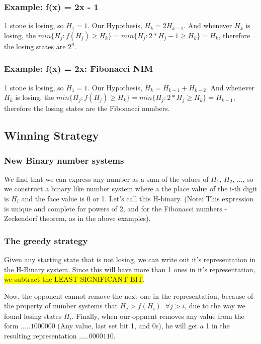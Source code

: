 \subsubsection{Example: f(x) = 2x - 1}
1 stone is losing, so $H_1 = 1$. Our Hypothesis, $H_k = 2 H_{k-1}$. And whenever $H_k$ is losing, the $min\{H_j : f(H_j) \geq H_k\} = min\{H_j : 2*H_j-1 \geq H_k\} = H_k$, therefore the losing states are $2^n$.
\subsubsection{Example: f(x) = 2x: Fibonacci NIM}
1 stone is losing, so $H_1 = 1$. Our Hypothesis, $H_k = H_{k-1} + H_{k-2}$. And whenever $H_k$ is losing, the $min\{H_j : f(H_j) \geq H_k\} = min\{H_j : 2*H_j \geq H_k\} = H_{k-1}$, therefore the losing states are the Fibonacci numbers.


\subsection{Winning Strategy}

\subsubsection{New Binary number systems}
We find that we can express any number as a sum of the values of $H_1$, $H_2$, ..., so we construct a binary like number system where a the place value of the i-th digit is $H_i$ and the face value is 0 or 1. Let's call this H-binary. (Note: This expression is unique and complete for powers of 2, and for the Fibonacci numbers - Zeckendorf theorem, as in the above examples).

\subsubsection{The greedy strategy}

Given any starting state that is not losing, we can write out it's representation in the H-Binary system.
Since this will have more than 1 ones in it's representation, \colorbox{yellow}{we subtract the LEAST SIGNIFICANT BIT}. 

Now, the opponent cannot remove the next one in the representation, because of the property of number systems that $H_j > f(H_i) \;\; \forall j > i$, due to the way we found losing states $H_i$. Finally, when our oppnent removes any value from the form $.....1000000$ (Any value, last set bit 1, and 0s), he will get a 1 in the resulting representation $.....0000110$. 

